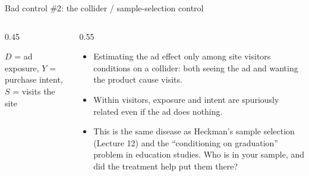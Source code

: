 \documentclass[aspectratio=169,11pt]{beamer}
\begin{document}
\begin{frame}{Bad control \#2: the collider / sample-selection control}
\begin{columns}
\begin{column}{0.45\textwidth}
\begin{center}
\end{center}
\smallskip
{\small $D$ = ad exposure, $Y$ = purchase intent, $S$ = visits the site}
\end{column}
\begin{column}{0.55\textwidth}
\begin{itemize}
	\item Estimating the ad effect \alert{only among site visitors} conditions on a
	collider: both seeing the ad and wanting the product cause visits.

	\item Within visitors, exposure and intent are spuriously related even if the ad
	does nothing.

	\item This is the same disease as Heckman's sample selection (Lecture 12) and the
	``conditioning on graduation'' problem in education studies. \alert{Who is in your
	sample, and did the treatment help put them there?}
\end{itemize}
\end{column}
\end{columns}
\end{frame}
\end{document}
